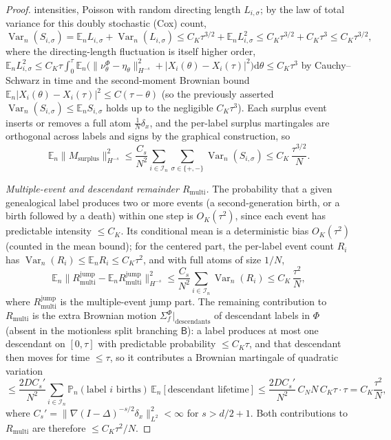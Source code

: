 \documentclass[a4paper,fleqn]{cas-sc}
\theoremstyle{definition}
\theoremstyle{remark}
\begin{document}
\begin{proof}
intensities, Poisson with random directing length $L_{i,\sigma}$; by the law of
total variance for this doubly stochastic (Cox) count,
\[
\operatorname{Var}_n(S_{i,\sigma})
=\mathbb E_n L_{i,\sigma}+\operatorname{Var}_n(L_{i,\sigma})
\le C_K\tau^{3/2}+\mathbb E_n L_{i,\sigma}^2
\le C_K\tau^{3/2}+C_K\tau^3\le C_K\tau^{3/2},
\]
where the directing-length fluctuation is itself higher order,
$\mathbb E_n L_{i,\sigma}^2\le C_K\tau\int_0^\tau\mathbb E_n\bigl(\|\nu^\Phi_\theta-\eta_\theta\|_{H^{-s}}^2+|X_i(\theta)-X_i(\tau)|^2\bigr)\mathrm d\theta\le C_K\tau^3$
by Cauchy--Schwarz in time and the second-moment Brownian bound
$\mathbb E_n|X_i(\theta)-X_i(\tau)|^2\le C(\tau-\theta)$ (so the previously asserted
$\operatorname{Var}_n(S_{i,\sigma})\le\mathbb E_nS_{i,\sigma}$ holds up to the
negligible $C_K\tau^3$). Each surplus event inserts or removes a full atom
$\frac1N\delta_x$, and the per-label surplus martingales are orthogonal across
labels and signs by the graphical construction, so
\[
\mathbb E_n\|M_{\mathrm{surplus}}\|_{H^{-s}}^2
\le\frac{C_s}{N^2}\sum_{i\in\mathcal I_n}\sum_{\sigma\in\{+,-\}}\operatorname{Var}_n(S_{i,\sigma})
\le C_K\,\frac{\tau^{3/2}}{N}.
\]

\emph{Multiple-event and descendant remainder $R_{\mathrm{multi}}$.} The
probability that a given genealogical label produces two or more events (a
second-generation birth, or a birth followed by a death) within one step is
$O_K(\tau^2)$, since each event has predictable intensity $\le C_K$. Its
conditional mean is a deterministic bias $O_K(\tau^2)$ (counted in the mean
bound); for the centered part, the per-label event count $R_i$ has
$\operatorname{Var}_n(R_i)\le\mathbb E_nR_i\le C_K\tau^2$, and with full atoms of
size $1/N$,
\[
\mathbb E_n\|R^{\mathrm{jump}}_{\mathrm{multi}}-\mathbb E_nR^{\mathrm{jump}}_{\mathrm{multi}}\|_{H^{-s}}^2
\le\frac{C_s}{N^2}\sum_{i\in\mathcal I_n}\operatorname{Var}_n(R_i)
\le C_K\,\frac{\tau^2}{N},
\]
where $R^{\mathrm{jump}}_{\mathrm{multi}}$ is the multiple-event jump part. The
remaining contribution to $R_{\mathrm{multi}}$ is the extra Brownian motion
$\Sigma^\Phi_f|_{\mathrm{descendants}}$ of descendant labels in $\Phi$ (absent in the
motionless split branching $\mathsf B$): a label produces at most one descendant on
$[0,\tau]$ with predictable probability $\le C_K\tau$, and that descendant then moves
for time $\le\tau$, so it contributes a Brownian martingale of quadratic variation
\[
\le\frac{2DC_s'}{N^2}\sum_{i\in\mathcal I_n}\mathbb P_n(\text{label }i\text{ births})\,\mathbb E_n[\text{descendant lifetime}]
\le\frac{2DC_s'}{N^2}\,C_NN\,C_K\tau\cdot\tau=C_K\frac{\tau^2}{N},
\]
where $C_s'=\|\nabla(I-\Delta)^{-s/2}\delta_x\|_{L^2}^2<\infty$ for $s>d/2+1$. Both
contributions to $R_{\mathrm{multi}}$ are therefore $\le C_K\tau^2/N$.


\end{proof}
\end{document}
